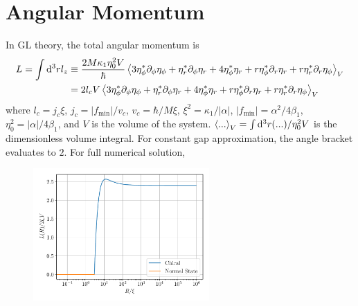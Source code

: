 \documentclass[aps,prl,preprint]{revtex4-2}
\begin{document}
\section{Angular Momentum}
In GL theory, the total angular momentum is
\begin{align}
    L = \int\dd[3]rl_z
     & \equiv \frac{2M\kappa_1\eta_0^2V}{\hbar}
    \ev{3\eta_\phi^*\partial_\phi\eta_\phi
        +\eta_r^*\partial_\phi\eta_r
        +4\eta_\phi^*\eta_r + r\eta_\phi^*\partial_r\eta_r
    +r\eta_r^*\partial_r\eta_\phi}_V            \\
     & = 2l_cV
    \ev{3\eta_\phi^*\partial_\phi\eta_\phi
        +\eta_r^*\partial_\phi\eta_r
        +4\eta_\phi^*\eta_r + r\eta_\phi^*\partial_r\eta_r
        +r\eta_r^*\partial_r\eta_\phi}_V
\end{align}
where $l_c = j_c\xi$, $j_c = |f_\text{min}|/v_c$, $v_c = \hbar/M\xi$,
$\xi^2 = \kappa_1/|\alpha|$, $|f_\text{min}| = \alpha^2/4\beta_1$,
$\eta_0^2 = |\alpha|/4\beta_1$,
and $V$ is the volume of the system.
$\ev{...}_V = \int\dd[3]r(...)/\eta_0^2V$ is the dimensionless volume integral.
For constant gap approximation, the angle bracket evaluates to $2$.
For full numerical solution,
\begin{figure}[h]
    \centering
    \includegraphics[width=0.6\textwidth]{../figures/L_r.pdf}
\end{figure}
\end{document}
